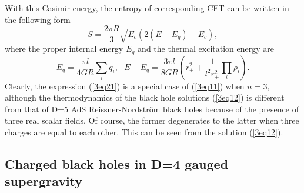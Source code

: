 \documentclass[a4paper,12pt]{article}
\begin{document}
With this Casimir energy,  the entropy of 
corresponding  CFT can be written in the following form
\begin{equation}
\label{3eq21}
S= \frac{2\pi R}{3}
   \sqrt{E_c(2(E-E_q)-E_c)}, 
\end{equation}
where the proper internal energy $E_q$ and the thermal excitation energy are 
\begin{equation}
E_q =\frac{\pi l}{4GR}\sum_i q_i, \ \ \ E-E_q=\frac{3\pi l}{8GR}\left (r_+^2 
  +\frac{1}{l^2 r_+^2}\prod_i \rho_i\right).
\end{equation}
Clearly, the expression (\ref{3eq21}) is a special case of (\ref{3eq11}) when
$n=3$, although the thermodynamics of the black hole solutions (\ref{3eq12}) is
different from that of D=5  AdS Reissner-Nordstr\"om black holes 
because of the presence of three real scalar fields. Of course, the former
degenerates to  the latter when three charges are equal to each other. This
can be seen from the solution (\ref{3eq12}).      




\subsection{Charged black holes in D=4 gauged supergravity}
\end{document}
